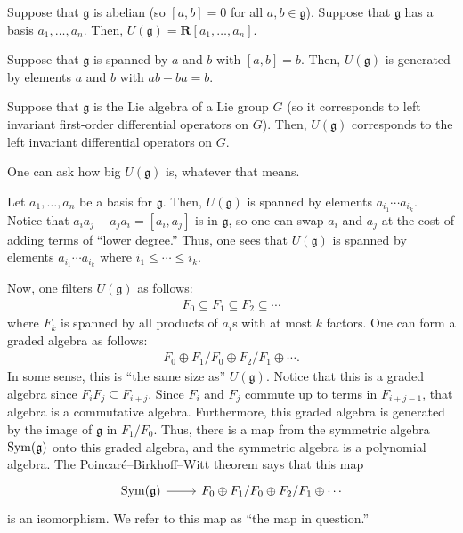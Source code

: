 \documentclass [11 pt, twoside] {article}
\begin{document}
\begin{example}[ ]\label{}\text{}
Suppose that $\mathfrak{g}$ is abelian (so $[a,b]=0$ for all $a,b\in \mathfrak{g}$).
Suppose that $\mathfrak{g}$ has a basis $a_1,\hdots, a_{n}$.
Then, $U(\mathfrak{g}) = \mathbf{R}[a_1,\hdots, a_{n}]$.
\end{example}

\begin{example}[ ]\label{}\text{}
Suppose that $\mathfrak{g}$ is spanned by $a$ and $b$ with $[a,b]=b$.
Then, $U(\mathfrak{g})$ is generated by elements $a$ and $b$ with $ab-ba=b$.
\end{example}

\begin{example}[ ]\label{}\text{}
Suppose that $\mathfrak{g}$ is the Lie algebra of a Lie group $G$ (so it corresponds to left invariant first-order differential operators on $G$).
Then, $U(\mathfrak{g})$ corresponds to the left invariant differential operators on $G$.
\end{example}

One can ask how big $U(\mathfrak{g})$ is, whatever that means.

Let $a_1,\hdots,a_{n}$ be a basis for $\mathfrak{g}$. 
Then, $U(\mathfrak{g})$ is spanned by elements $a_{i_1}\cdots a_{i_{k}}$. 
Notice that $a_{i}a_{j}-a_{j}a_{i}=[a_{i},a_{j}]$ is in $\mathfrak{g}$, so one can swap $a_{i}$ and $a_{j}$ at the cost of adding terms of ``lower degree.''
Thus, one sees that $U(\mathfrak{g})$ is spanned by elements $a_{i_1}\cdots a_{i_{k}}$ where $i_1\le\cdots\le i_{k}$.

Now, one filters $U(\mathfrak{g})$ as follows:
\begin{align*}
	F_0\subseteq F_1\subseteq F_2\subseteq\cdots 
\end{align*}
where $F_{k}$ is spanned by all products of $a_{i}$s with at most $k$ factors.
One can form a graded algebra as follows:
\begin{align*}
	F_0\oplus F_1/F_0\oplus F_2/F_1\oplus\cdots.
\end{align*}
In some sense, this is ``the same size as'' $U(\mathfrak{g})$.
Notice that this is a graded algebra since $F_{i}F_{j}\subseteq F_{i+j}$.
Since $F_{i}$ and $F_{j}$ commute up to terms in $F_{i+j-1}$, that algebra is a commutative algebra.
Furthermore, this graded algebra is generated by the image of $\mathfrak{g}$ in $F_1/F_0$.
Thus, there is a map from the symmetric algebra $\operatorname{Sym}(\mathfrak{g})$ onto this graded algebra, and the symmetric algebra is a polynomial algebra.
The Poincar\'e--Birkhoff--Witt theorem says that this map 
\[
\begin{tikzcd}
	\Sym(\mathfrak{g}) \ar[r]& F_0\oplus F_1/F_0\oplus F_2/F_1\oplus \cdots
\end{tikzcd}
\]
is an isomorphism.
We refer to this map as ``the map in question.''
\end{document}
